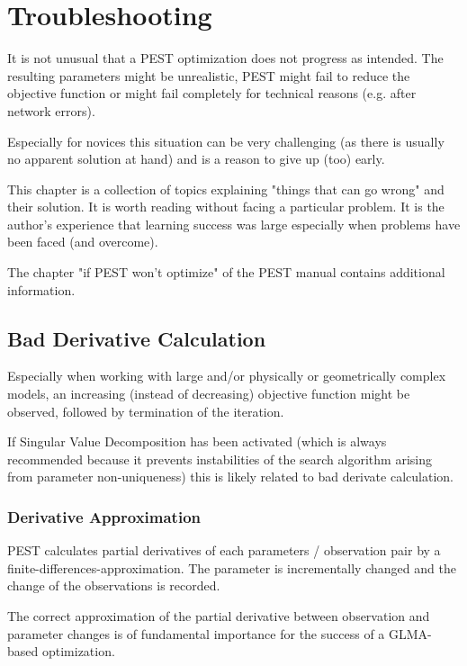 \chapter{Troubleshooting}

It is not unusual that a PEST optimization does not progress as intended. The resulting parameters might be unrealistic, PEST might fail to reduce the objective function or might fail completely for technical reasons (e.g. after network errors).

Especially for novices this situation can be very challenging (as there is usually no apparent solution at hand) and is a reason to give up (too) early. 

This chapter is a collection of topics explaining "things that can go wrong" and their solution. It is worth reading without facing a particular problem. It is the author's experience that learning success was large especially when problems have been faced (and overcome).

The chapter "if PEST won't optimize" of the PEST manual contains additional information.

\section{Bad Derivative Calculation}
\label{sec:troubles:derivative}

Especially when working with large and/or physically or geometrically complex models, an increasing (instead of decreasing) objective function might be observed, followed by termination of the iteration.

If Singular Value Decomposition has been activated (which is always recommended because it prevents instabilities of the search algorithm arising from parameter non-uniqueness) this is likely related to bad derivate calculation.

\subsection{Derivative Approximation}

PEST calculates partial derivatives of each parameters / observation pair by a finite-differences-approximation. The parameter is incrementally changed and the change of the observations is recorded.

The correct approximation of the partial derivative between observation and parameter changes is of fundamental importance for the success of a GLMA-based optimization.

